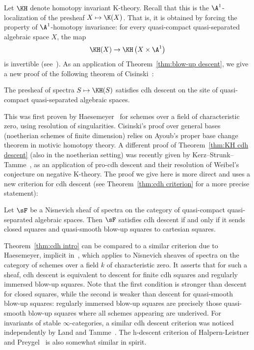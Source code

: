 Let $\KH$ denote homotopy invariant K-theory. Recall that this is the $\A^1$-localization of the presheaf $X \mapsto \K(X)$. That is, it is obtained by forcing the property of $\A^1$-homotopy invariance: for every quasi-compact quasi-separated algebraic space $X$, the map
\[
\KH(X) \to \KH\left(X \times \A^1\right)
\]
is invertible (see~\cite{CisinskiKH,WeibelKH}). As an application of Theorem~\ref{thm:blow-up descent}, we give a new proof of the following theorem of Cisinski~\cite{CisinskiKH}:

\begin{thmX}\label{thm:KH cdh descent}
The presheaf of spectra $S \mapsto \KH(S)$ satisfies cdh descent on the site of quasi-compact quasi-separated algebraic spaces.
\end{thmX}

This was first proven by Haesemeyer~\cite{Haesemeyer} for schemes over a field of characteristic zero, using resolution of singularities. Cisinski's proof over general bases (noetherian schemes of finite dimension) relies on Ayoub's proper base change theorem in motivic homotopy theory. A different proof of Theorem~\ref{thm:KH cdh descent} (also in the noetherian setting) was recently given by Kerz--Strunk--Tamme~\cite[Theorem~C]{KerzStrunkTamme}, as an application of pro-cdh descent and their resolution of Weibel's conjecture on negative K-theory. The proof we give here is more direct and uses a new criterion for cdh descent (see Theorem~\ref{thm:cdh criterion} for a more precise statement):

\begin{thmX}\label{thm:cdh intro}
Let $\sF$ be a Nisnevich sheaf of spectra on the category of quasi-compact quasi-separated algebraic spaces. Then $\sF$ satisfies cdh descent if and only if it sends closed squares and quasi-smooth blow-up squares to cartesian squares.
\end{thmX}

Theorem~\ref{thm:cdh intro} can be compared to a similar criterion due to Haesemeyer, implicit in~\cite{Haesemeyer}, which applies to Nisnevich sheaves of spectra on the category of schemes over a field $k$ of characteristic zero. It asserts that for such a sheaf, cdh descent is equivalent to descent for finite cdh squares and regularly immersed blow-up squares. Note that the first condition is stronger than descent for closed squares, while the second is weaker than descent for quasi-smooth blow-up squares: regularly immersed blow-up squares are precisely those quasi-smooth blow-up squares where all schemes appearing are underived. For invariants of stable $\infty$-categories, a similar cdh descent criterion was noticed independently by Land and Tamme~\cite[Theorem.~A.2]{LandTamme}. The h-descent criterion of Halpern-Leistner and Preygel~\cite[Proposition~3.2.1]{HalpernLeistnerPreygel} is also somewhat similar in spirit.

